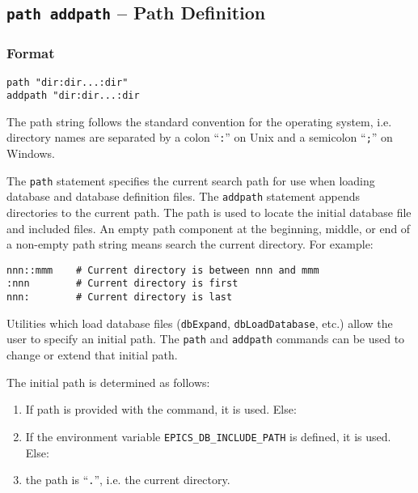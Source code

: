 \subsection{\texttt{path addpath} -- Path Definition}

\subsubsection{Format}

\begin{lstlisting}[language=dbd]
path "dir:dir...:dir"
addpath "dir:dir...:dir
\end{lstlisting}

The path string follows the standard convention for the operating system, i.e. directory names are separated by a colon ``\verb|:|'' on Unix
and a semicolon ``\verb|;|'' on Windows.

The \verb|path| statement specifies the current search path for use when loading database and database definition files.
The \verb|addpath| statement appends directories to the current path.
The path is used to locate the initial database file and included files.
An empty path component at the beginning, middle, or end of a non-empty path string means search the current directory.
For example:

\begin{lstlisting}[language=dbd]
nnn::mmm    # Current directory is between nnn and mmm
:nnn        # Current directory is first
nnn:        # Current directory is last
\end{lstlisting}

Utilities which load database files (\verb|dbExpand|, \verb|dbLoadDatabase|, etc.) allow the user to specify an initial path.
The \verb|path| and \verb|addpath| commands can be used to change or extend that initial path.

The initial path is determined as follows:

\begin{enumerate}
\item If path is provided with the command, it is used.
Else:

\item If the environment variable \verb|EPICS_DB_INCLUDE_PATH| is defined, it is used.
Else:

\item the path is ``\verb|.|'', i.e. the current directory.
\end{enumerate}


